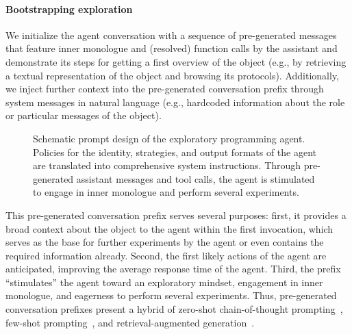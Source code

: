 \paragraph{Bootstrapping exploration}
We initialize the agent conversation with a sequence of pre-generated messages that feature inner monologue and (resolved) function calls by the assistant and demonstrate its steps for getting a first overview of the object (e.g., by retrieving a textual representation of the object and browsing its protocols).
Additionally, we inject further context into the pre-generated conversation prefix through system messages in natural language (e.g., hardcoded information about the role or particular messages of the object).

\begin{figure}
	\centering
	\begin{threeparttable}
		\centering
		{\footnotesize
		}
	\end{threeparttable}
	\caption[Schematic prompt design of the exploratory programming agent.]{
		Schematic prompt design of the exploratory programming agent.
		Policies for the identity, strategies, and output formats of the agent are translated into comprehensive system instructions.
		Through pre-generated assistant messages and tool calls, the agent is stimulated to engage in inner monologue and perform several experiments.
	}
	\label{fig:agent/prompts/design}
\end{figure}

This pre-generated conversation prefix serves several purposes:
first, it provides a broad context about the object to the agent within the first invocation, which serves as the base for further experiments by the agent or even contains the required information already.
Second, the first likely actions of the agent are anticipated, improving the average response time of the agent.
Third, the prefix ``stimulates'' the agent toward an exploratory mindset, engagement in inner monologue, and eagerness to perform several experiments.
Thus, pre-generated conversation prefixes present a hybrid of zero-shot chain-of-thought prompting~\cite{kojima2022large}, few-shot prompting~\cite{brown2020language}, and retrieval-augmented generation~\cite{lewis2020retrieval}.
